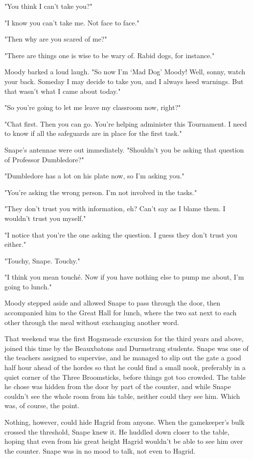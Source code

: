 "You think I can't take you?"

"I know you can't take me. Not face to face."

"Then why are you scared of me?"

"There are things one is wise to be wary of. Rabid dogs, for instance."

Moody barked a loud laugh. "So now I'm `Mad Dog' Moody! Well, sonny, watch your back. Someday I may decide to take you, and I always heed warnings. But that wasn't what I came about today."

"So you're going to let me leave my classroom now, right?"

"Chat first. Then you can go. You're helping administer this Tournament. I need to know if all the safeguards are in place for the first task."

Snape's antennae were out immediately. "Shouldn't you be asking that question of Professor Dumbledore?"

"Dumbledore has a lot on his plate now, so I'm asking you."

"You're asking the wrong person. I'm not involved in the tasks."

"They don't trust you with information, eh? Can't say as I blame them. I wouldn't trust you myself."

"I notice that you're the one asking the question. I guess they don't trust you either."

"Touchy, Snape. Touchy."

"I think you mean touché. Now if you have nothing else to pump me about, I'm going to lunch."

Moody stepped aside and allowed Snape to pass through the door, then accompanied him to the Great Hall for lunch, where the two sat next to each other through the meal without exchanging another word.

That weekend was the first Hogsmeade excursion for the third years and above, joined this time by the Beauxbatons and Durmstrang students. Snape was one of the teachers assigned to supervise, and he managed to slip out the gate a good half hour ahead of the hordes so that he could find a small nook, preferably in a quiet corner of the Three Broomsticks, before things got too crowded. The table he chose was hidden from the door by part of the counter, and while Snape couldn't see the whole room from his table, neither could they see him. Which was, of course, the point.

Nothing, however, could hide Hagrid from anyone. When the gamekeeper's bulk crossed the threshold, Snape knew it. He huddled down closer to the table, hoping that even from his great height Hagrid wouldn't be able to see him over the counter. Snape was in no mood to talk, not even to Hagrid.

